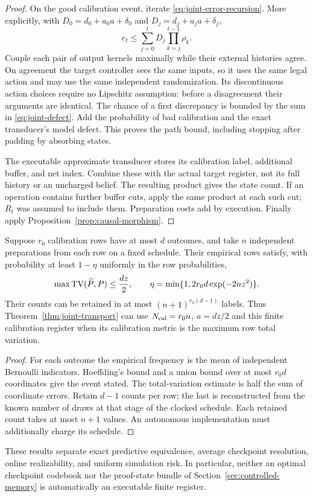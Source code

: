 \begin{proof}
On the good calibration event, iterate \eqref{eq:joint-error-recursion}.
More explicitly, with $D_0=d_0+a_0a+\delta_0$ and
$D_j=d_j+a_ja+\delta_j$,
\[
 e_t\le\sum_{j=0}^tD_j\prod_{k=j}^{t-1}\rho_k.
\]
Couple each pair of output kernels maximally while their external
histories agree. On agreement the target controller sees the same
inputs, so it uses the same legal action and may use the same independent
randomization. Its discontinuous action choices require no Lipschitz
assumption: before a disagreement their arguments are identical.
The chance of a first discrepancy is bounded by the sum in
\eqref{eq:joint-defect}. Add the probability of bad calibration and the
exact transducer's model defect. This proves the path bound, including
stopping after padding by absorbing states.

The executable approximate transducer stores its calibration label,
additional buffer, and net index. Combine these with the actual target
register, not its full history or an uncharged belief. The resulting
product gives the state count. If an operation contains further buffer
cuts, apply the same product at each such cut; $R_t$ was assumed to
include them. Preparation costs add by execution. Finally apply
Proposition~\ref{prop:causal-morphism}.
\end{proof}

\begin{corollary}\label{cor:calibration-register}
Suppose $r_0$ calibration rows have at most $d$ outcomes, and take $n$
independent preparations from each row on a fixed schedule. Their
empirical rows satisfy, with probability at least $1-\eta$ uniformly in
the row probabilities,
\[
 \max\operatorname{TV}(\widehat P,P)\le\frac{dz}{2},\qquad
       \eta=\min\{1,2r_0d\exp(-2nz^2)\}.
\]
Their counts can be retained in at most
$(n+1)^{r_0(d-1)}$ labels. Thus Theorem~\ref{thm:joint-transport} can use
$N_{\rm cal}=r_0n$, $a=dz/2$ and this finite calibration register when
its calibration metric is the maximum row total variation.
\end{corollary}
\begin{proof}
For each outcome the empirical frequency is the mean of independent
Bernoulli indicators. Hoeffding's bound and a union bound over at most
$r_0d$ coordinates give the event stated. The total-variation estimate
is half the sum of coordinate errors. Retain $d-1$ counts per row;
the last is reconstructed from the known number of draws at that stage
of the clocked schedule. Each retained count takes at most $n+1$ values.
An autonomous implementation must additionally charge its schedule.
\end{proof}

These results separate exact predictive equivalence, average checkpoint
resolution, online realizability, and uniform simulation risk. In
particular, neither an optimal checkpoint codebook nor the proof-state
bundle of Section~\ref{sec:controlled-memory} is automatically an
executable finite register.
